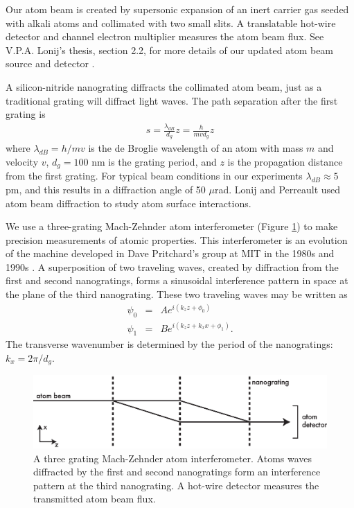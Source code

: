 Our atom beam is created by supersonic expansion \cite{Hab85, Sco88} of an inert carrier gas seeded with alkali atoms and collimated with two small slits. A translatable hot-wire detector \cite{Del02RSI} and channel electron multiplier measures the atom beam flux. See V.P.A. Lonij's thesis, section 2.2, for more details of our updated atom beam source and detector \cite{Lon11a}.


A silicon-nitride nanograting diffracts the collimated atom beam, just as a traditional grating will diffract light waves. The path separation after the first grating is 
\begin{eqnarray}
\label{sepEqn}
s=\frac{\lambda_{dB}}{d_g}z=\frac{h}{mvd_g}z
\end{eqnarray}
where $\lambda_{dB}=h/mv$ is the de Broglie wavelength of an atom with mass $m$ and velocity $v$, $d_g=100$ nm is the grating period, and $z$ is the propagation distance from the first grating. For typical beam conditions in our experiments $\lambda_{dB}\approx5$ pm, and this results in a diffraction angle of 50 $\mu$rad. Lonij \etal \cite{Lon09,Lon10} and Perreault \etal \cite{Per05pra} used atom beam diffraction to study atom surface interactions. 


We use a three-grating Mach-Zehnder atom interferometer (Figure \ref{simpleIFM}) to make precision measurements of atomic properties. This interferometer is an evolution of the machine developed in Dave Pritchard's group at MIT in the 1980s and 1990s \cite{Kei91,Ber97,Kok01}. A superposition of two traveling waves, created by diffraction from the first and second nanogratings, forms a sinusoidal interference pattern in space at the plane of the third nanograting. These two traveling waves may be written as 
\begin{eqnarray}
\psi_{0}&=&Ae^{i(k_z z + \phi_0)}\\
\psi_{1}&=&Be^{i(k_z z + k_x x + \phi_1)}.
\end{eqnarray}
The transverse wavenumber is determined by the period of the nanogratings: $k_x=2\pi/d_g$. 


\begin{figure}
\includegraphics[width=1\textwidth]{Figures/bareIFM.eps}
\caption[A three grating Mach-Zehnder atom interferometer.]{\label{simpleIFM}A three grating Mach-Zehnder atom interferometer. Atoms waves diffracted by the first and second nanogratings form an interference pattern at the third nanograting. A hot-wire detector measures the transmitted atom beam flux.}
\end{figure}


